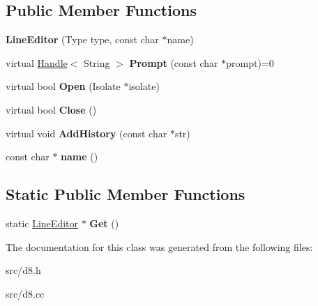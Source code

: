 \subsection*{Public Member Functions}
\begin{DoxyCompactItemize}
\item 
\hypertarget{classv8_1_1_line_editor_af3cf37410b6c05103e7a8bc4117d90e5}{}{\bfseries Line\+Editor} (Type type, const char $\ast$name)\label{classv8_1_1_line_editor_af3cf37410b6c05103e7a8bc4117d90e5}

\item 
\hypertarget{classv8_1_1_line_editor_a1f5a64ab706ad1b8970591ad4c8c78bb}{}virtual \hyperlink{classv8_1_1_handle}{Handle}$<$ String $>$ {\bfseries Prompt} (const char $\ast$prompt)=0\label{classv8_1_1_line_editor_a1f5a64ab706ad1b8970591ad4c8c78bb}

\item 
\hypertarget{classv8_1_1_line_editor_a54d94f2f0a211913214bfb8a82e46362}{}virtual bool {\bfseries Open} (Isolate $\ast$isolate)\label{classv8_1_1_line_editor_a54d94f2f0a211913214bfb8a82e46362}

\item 
\hypertarget{classv8_1_1_line_editor_a1325a9a4146a3d2d3beff400148f1c6d}{}virtual bool {\bfseries Close} ()\label{classv8_1_1_line_editor_a1325a9a4146a3d2d3beff400148f1c6d}

\item 
\hypertarget{classv8_1_1_line_editor_abee2bebfd2a98940f11be74092e76716}{}virtual void {\bfseries Add\+History} (const char $\ast$str)\label{classv8_1_1_line_editor_abee2bebfd2a98940f11be74092e76716}

\item 
\hypertarget{classv8_1_1_line_editor_a5212b5e9b69bfdce87874d055872af25}{}const char $\ast$ {\bfseries name} ()\label{classv8_1_1_line_editor_a5212b5e9b69bfdce87874d055872af25}

\end{DoxyCompactItemize}
\subsection*{Static Public Member Functions}
\begin{DoxyCompactItemize}
\item 
\hypertarget{classv8_1_1_line_editor_a5339babda669bd587fd83617c5693f07}{}static \hyperlink{classv8_1_1_line_editor}{Line\+Editor} $\ast$ {\bfseries Get} ()\label{classv8_1_1_line_editor_a5339babda669bd587fd83617c5693f07}

\end{DoxyCompactItemize}


The documentation for this class was generated from the following files\+:\begin{DoxyCompactItemize}
\item 
src/d8.\+h\item 
src/d8.\+cc\end{DoxyCompactItemize}
